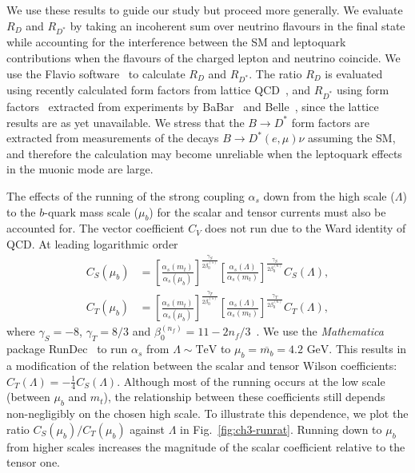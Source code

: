 We use these results to guide our study but proceed more generally. We evaluate
$R_D$ and $R_{D^{*}}$ by taking an incoherent sum over neutrino flavours in the
final state while accounting for the interference between the SM and leptoquark
contributions when the flavours of the charged lepton and neutrino coincide. We
use the \textsf{Flavio} software~\cite{Straub:2018kue} to calculate $R_{D}$ and
$R_{D^{*}}$. The ratio $R_D$ is evaluated using recently calculated form factors
from lattice QCD~\cite{Lattice:2015rga}, and $R_{D^{*}}$ using form
factors~\cite{Amhis:2012bh} extracted from experiments by
BaBar~\cite{Aubert:2007rs, Aubert:2008yv} and Belle~\cite{Abe:2001yf,
  Dungel:2010uk, Abdesselam:2017kjf}, since the lattice results are as yet
unavailable. We stress that the $B \rightarrow D^{*}$ form factors are extracted
from measurements of the decays $B \rightarrow D^* (e, \mu) \nu$ assuming the
SM, and therefore the calculation may become unreliable when the leptoquark
effects in the muonic mode are large.

The effects of the running of the strong coupling $\alpha_s$ down from the high
scale ($\Lambda$) to the $b$-quark mass scale ($\mu_b$) for the scalar and
tensor currents must also be accounted for. The vector coefficient $C_V$ does
not run due to the Ward identity of QCD. At leading logarithmic order
\begin{subequations} \label{eq:ch3-runningrd}
  \begin{align}
    C_S (\mu_b) &= \left[ \frac{\alpha_s(m_t)}{\alpha_s(\mu_b)} \right]^{\frac{\gamma_S}{2\beta_0^{(5)}}} \left[ \frac{\alpha_s(\Lambda)}{\alpha_s(m_t)} \right]^{\frac{\gamma_S}{2\beta_0^{(6)}}} C_S(\Lambda),\\
    C_T (\mu_b) &= \left[ \frac{\alpha_s(m_t)}{\alpha_s(\mu_b)} \right]^{\frac{\gamma_T}{2\beta_0^{(5)}}} \left[ \frac{\alpha_s(\Lambda)}{\alpha_s(m_t)} \right]^{\frac{\gamma_T}{2\beta_0^{(6)}}}C_T(\Lambda),
  \end{align}
\end{subequations}
where $\gamma_S = -8$, $\gamma_T = 8/3$ and $\beta_0^{(n_f)} = 11 -
2n_f/3$~\cite{Dorsner:2013tla}. We use the \textit{Mathematica} package
\textsf{RunDec}~\cite{Chetyrkin:2000yt} to run $\alpha_s$ from $\Lambda \sim
\text{TeV}$ to $\mu_b = \overline{m_b} = 4.2 \text{ GeV}$. This results in a
modification of the relation between the scalar and tensor Wilson coefficients:
$C_T(\Lambda) = -\frac{1}{4} C_S(\Lambda)$. Although most of the running occurs
at the low scale (between $\mu_b$ and $m_t$), the relationship between these
coefficients still depends non-negligibly on the chosen high scale. To
illustrate this dependence, we plot the ratio $C_S(\mu_b)/C_T(\mu_b)$ against
$\Lambda$ in Fig.~\ref{fig:ch3-runrat}. Running down to $\mu_b$ from higher scales
increases the magnitude of the scalar coefficient relative to the tensor one.

